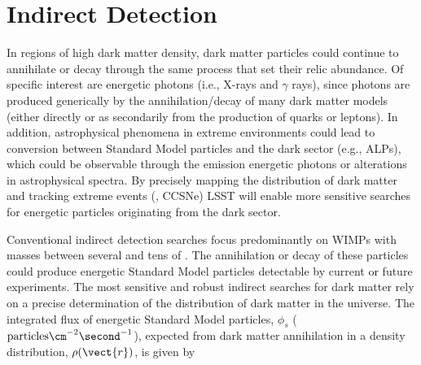 \section{Indirect Detection }

In regions of high dark matter density, dark matter particles could continue to annihilate or decay through the same process that set their relic abundance.
Of specific interest are energetic photons (i.e., X-rays and $\gamma$ rays), since photons are produced generically by the annihilation/decay of many dark matter models (either directly or as secondarily from the production of quarks or leptons). In addition, astrophysical phenomena in extreme environments could lead to conversion between Standard Model particles and the dark sector (e.g., ALPs), which could be observable through the emission energetic photons or alterations in astrophysical spectra.
By precisely mapping the distribution of dark matter and tracking extreme events (\eg, CCSNe) LSST will enable more sensitive searches for energetic particles originating from the dark sector.

Conventional indirect detection searches focus predominantly on WIMPs with masses between several \GeV and tens of \TeV. 
The annihilation or decay of these particles could produce energetic Standard Model particles detectable by current or future experiments.
The most sensitive and robust indirect searches for dark matter rely on a precise determination of the distribution of dark matter in the universe.
The integrated flux of energetic Standard Model particles, $\phi_s$ (${\rm particles} \cm^{-2} \second^{-1}$), expected from dark matter annihilation in a density distribution, $\rho(\vect{r})$, is given by

